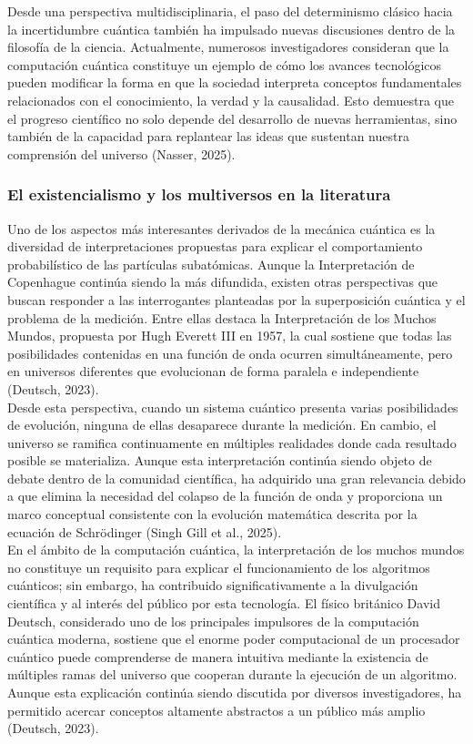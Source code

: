 \documentclass[12pt,a4paper]{article}
\begin{document}
Desde una perspectiva multidisciplinaria, el paso del determinismo clásico hacia la incertidumbre cuántica también ha impulsado nuevas discusiones dentro de la filosofía de la ciencia. Actualmente, numerosos investigadores consideran que la computación cuántica constituye un ejemplo de cómo los avances tecnológicos pueden modificar la forma en que la sociedad interpreta conceptos fundamentales relacionados con el conocimiento, la verdad y la causalidad. Esto demuestra que el progreso científico no solo depende del desarrollo de nuevas herramientas, sino también de la capacidad para replantear las ideas que sustentan nuestra comprensión del universo (Nasser, 2025).\\

\subsubsection{El existencialismo y los multiversos en la literatura}
Uno de los aspectos más interesantes derivados de la mecánica cuántica es la diversidad de interpretaciones propuestas para explicar el comportamiento probabilístico de las partículas subatómicas. Aunque la Interpretación de Copenhague continúa siendo la más difundida, existen otras perspectivas que buscan responder a las interrogantes planteadas por la superposición cuántica y el problema de la medición. Entre ellas destaca la Interpretación de los Muchos Mundos, propuesta por Hugh Everett III en 1957, la cual sostiene que todas las posibilidades contenidas en una función de onda ocurren simultáneamente, pero en universos diferentes que evolucionan de forma paralela e independiente (Deutsch, 2023).\\

Desde esta perspectiva, cuando un sistema cuántico presenta varias posibilidades de evolución, ninguna de ellas desaparece durante la medición. En cambio, el universo se ramifica continuamente en múltiples realidades donde cada resultado posible se materializa. Aunque esta interpretación continúa siendo objeto de debate dentro de la comunidad científica, ha adquirido una gran relevancia debido a que elimina la necesidad del colapso de la función de onda y proporciona un marco conceptual consistente con la evolución matemática descrita por la ecuación de Schrödinger (Singh Gill et al., 2025).\\

En el ámbito de la computación cuántica, la interpretación de los muchos mundos no constituye un requisito para explicar el funcionamiento de los algoritmos cuánticos; sin embargo, ha contribuido significativamente a la divulgación científica y al interés del público por esta tecnología. El físico británico David Deutsch, considerado uno de los principales impulsores de la computación cuántica moderna, sostiene que el enorme poder computacional de un procesador cuántico puede comprenderse de manera intuitiva mediante la existencia de múltiples ramas del universo que cooperan durante la ejecución de un algoritmo. Aunque esta explicación continúa siendo discutida por diversos investigadores, ha permitido acercar conceptos altamente abstractos a un público más amplio (Deutsch, 2023).\\
\end{document}
